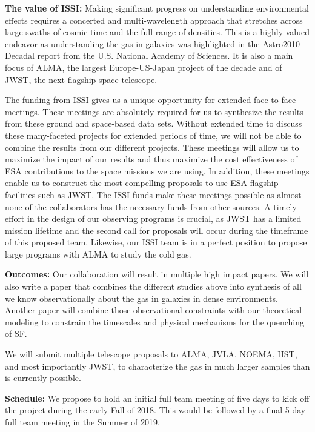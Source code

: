 \documentclass[11pt]{article}
\begin{document}
\textbf{The value of ISSI:}  
Making significant progress on understanding environmental effects requires a concerted and
multi-wavelength approach that stretches across large swaths of cosmic
time and the full range of densities.  This is a highly valued endeavor as understanding the gas in
galaxies was highlighted in the Astro2010 Decadal report from the
U.S. National Academy of Sciences.  It is also a main focus of ALMA,
the largest Europe-US-Japan project of the decade and of JWST, the next flagship space telescope.

The funding from ISSI gives us a unique opportunity for extended face-to-face meetings.  These meetings are absolutely required for us to synthesize the results from these ground and space-based data sets.  Without extended time to discuss these many-faceted projects for extended periods of time, we will not be able to combine the results from our different projects.  These meetings will allow us to maximize the impact of our results and thus maximize the cost effectiveness of ESA contributions to the space missions we are using.  In addition, these meetings enable us to construct the most compelling proposals to use ESA flagship facilities such as JWST.  The ISSI
funds make these meetings possible as almost none of the collaborators has the
necessary funds from other sources.
A timely effort in the design of our observing programs is crucial, as JWST has a limited mission lifetime and the second call for proposals will occur during the timeframe of this proposed team. Likewise, our ISSI team
is in a perfect position to propose large programs with ALMA to study the
cold gas.  

\textbf{Outcomes:} Our collaboration will result in multiple high
impact papers.  We will also write a
paper that combines the different studies above into synthesis of all we know observationally about the gas in galaxies in
dense environments.  Another paper will combine those observational
constraints with our theoretical modeling to constrain the timescales
and physical mechanisms for the quenching of SF.

We will submit multiple telescope proposals to ALMA, JVLA, NOEMA, HST, and most importantly JWST, 
 to characterize the gas in much larger samples than is currently possible.

\textbf{Schedule:} We propose to hold an initial full team meeting of five days to kick off the project during the early Fall of 2018. This would be followed by a final 5 day full team meeting in the Summer of 2019. 
\end{document}

